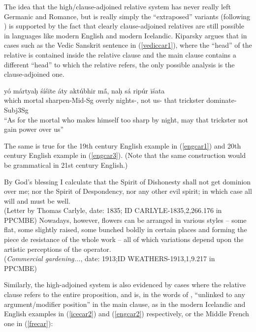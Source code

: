The idea that the high/clause-adjoined relative system has never really left Germanic and Romance, but is really simply the ``extraposed'' variants (following \citealt{culicoverrochemont1990}) is supported by the fact that clearly clause-adjoined relatives are still possible in languages like modern English and modern Icelandic. Kiparsky argues that in cases such as the Vedic Sanskrit sentence in (\ref{vediccar1}), where the ``head'' of the relative is contained inside the relative clause and the main clause contains a different ``head'' to which the relative refers, the only possible analysis is the clause-adjoined one.

\begin{exe}

\ex \label{vediccar1} \gll yó mártya\d{h} śíś\={i}te áty aktúbhir m\={\'{a}}, na\d{h} sá ripúr \={i}śata \\
which mortal sharpen-Mid-Sg overly nights-, not us- that trickster dominate-Subj3Sg\\
\quad ``As for the mortal who makes himself too sharp by night, may that trickster not gain power over us''\\
\citep[RV 1.36.16, cited in][156]{kiparsky1995}
\end{exe}

\noindent The same is true for the 19th century English example in (\ref{engcar1}) and 20th century English example in (\ref{engcar3}). (Note that the same construction would be grammatical in 21st century English.)

\begin{exe}
         \ex \label{engcar1} By God's blessing I calculate that the Spirit of Dishonesty shall not get dominion over me; nor the Spirit of Despondency, nor any other evil spirit; in which case
all will and must be well.\\
(Letter by Thomas Carlyle, date: 1835; ID CARLYLE-1835,2,266.176 in PPCMBE)
        \ex \label{engcar3} Nowadays, however, flowers can be arranged in various styles -- some flat, some slightly raised, some bunched boldly in certain
places and forming the piece de resistance of
the whole work -- all of which variations depend upon the artistic
perceptions of the operator.\\
        (\textsl{Commercial gardening...}, date: 1913;ID WEATHERS-1913,1,9.217 in \\PPCMBE)
\end{exe}

\noindent Similarly, the high-adjoined system is also evidenced by cases where the relative clause refers to the entire proposition, and is, in the words of \citet[][157]{kiparsky1995}, ``unlinked to any argument/modifier position'' in the main clause, as in the modern Icelandic and English examples in (\ref{icecar2}) and (\ref{engcar2}) respectively, or the Middle French one in (\ref{frecar}):

